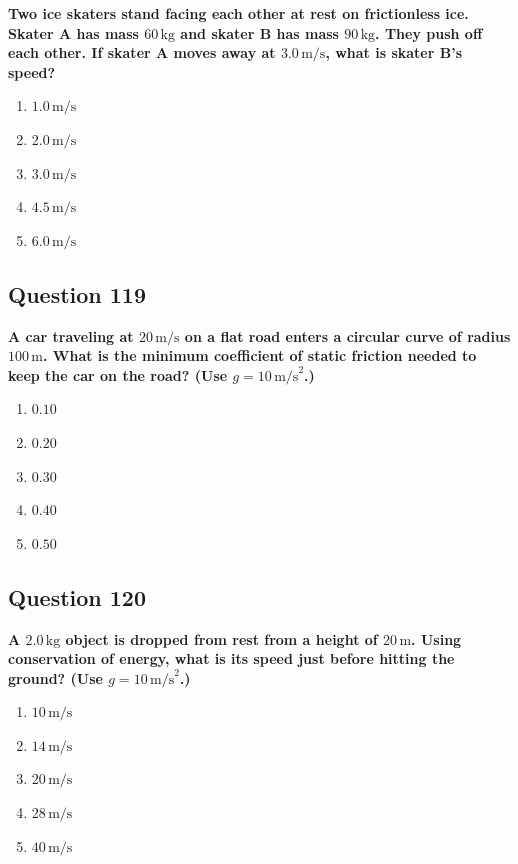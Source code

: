 \documentclass[12pt,letterpaper]{article}
\begin{document}
\begin{questionbox}
\textbf{Two ice skaters stand facing each other at rest on frictionless ice. Skater A has mass $60\,\text{kg}$ and skater B has mass $90\,\text{kg}$. They push off each other. If skater A moves away at $3.0\,\text{m/s}$, what is skater B's speed?}

\begin{enumerate}[label=\alph*)]
    \item $1.0\,\text{m/s}$
    \item $2.0\,\text{m/s}$
    \item $3.0\,\text{m/s}$
    \item $4.5\,\text{m/s}$
    \item $6.0\,\text{m/s}$
\end{enumerate}
\end{questionbox}

\subsection{Question 119}

\begin{questionbox}
\textbf{A car traveling at $20\,\text{m/s}$ on a flat road enters a circular curve of radius $100\,\text{m}$. What is the minimum coefficient of static friction needed to keep the car on the road? (Use $g = 10\,\text{m/s}^2$.)}

\begin{enumerate}[label=\alph*)]
    \item $0.10$
    \item $0.20$
    \item $0.30$
    \item $0.40$
    \item $0.50$
\end{enumerate}
\end{questionbox}

\subsection{Question 120}

\begin{questionbox}
\textbf{A $2.0\,\text{kg}$ object is dropped from rest from a height of $20\,\text{m}$. Using conservation of energy, what is its speed just before hitting the ground? (Use $g = 10\,\text{m/s}^2$.)}

\begin{enumerate}[label=\alph*)]
    \item $10\,\text{m/s}$
    \item $14\,\text{m/s}$
    \item $20\,\text{m/s}$
    \item $28\,\text{m/s}$
    \item $40\,\text{m/s}$
\end{enumerate}
\end{questionbox}
\end{document}
